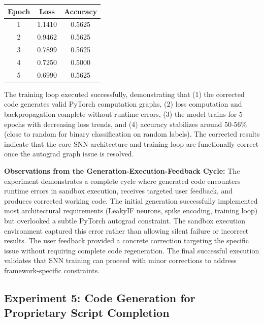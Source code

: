 \begin{center}
  \begin{tabular}{ccc}
    \toprule
    \textbf{Epoch} & \textbf{Loss} & \textbf{Accuracy} \\
    \midrule
    1              & 1.1410        & 0.5625            \\
    2              & 0.9462        & 0.5625            \\
    3              & 0.7899        & 0.5625            \\
    4              & 0.7250        & 0.5000            \\
    5              & 0.6990        & 0.5625            \\
    \bottomrule
  \end{tabular}
\end{center}

The training loop executed successfully, demonstrating that (1) the corrected code generates valid PyTorch computation graphs, (2) loss computation and backpropagation complete without runtime errors, (3) the model trains for 5 epochs with decreasing loss trends, and (4) accuracy stabilizes around 50-56\% (close to random for binary classification on random labels). The corrected results indicate that the core SNN architecture and training loop are functionally correct once the autograd graph issue is resolved.

\vspace{0.3cm}

\noindent \textbf{Observations from the Generation-Execution-Feedback Cycle:} The experiment demonstrates a complete cycle where generated code encounters runtime errors in sandbox execution, receives targeted user feedback, and produces corrected working code. The initial generation successfully implemented most architectural requirements (LeakyIF neurons, spike encoding, training loop) but overlooked a subtle PyTorch autograd constraint. The sandbox execution environment captured this error rather than allowing silent failure or incorrect results. The user feedback provided a concrete correction targeting the specific issue without requiring complete code regeneration. The final successful execution validates that SNN training can proceed with minor corrections to address framework-specific constraints.


\subsection{Experiment 5: Code Generation for Proprietary Script Completion}

